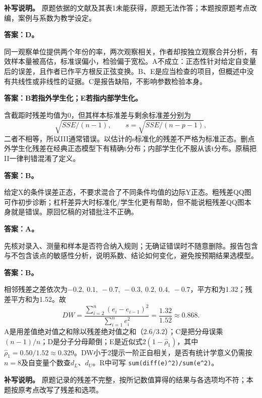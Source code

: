 \textbf{补写说明。} 原题依据的文献及其表1未能获得，原题无法作答；本题按原题考点改编，案例与系数为教学设定。



\textbf{答案：D。}

同一观察单位提供两个年份的率，两次观察相关，作者却按独立观察合并分析，有效样本量被高估，标准误偏小，检验偏于宽松。A不成立：正态性针对给定自变量后的误差，且作者已作平方根反正弦变换。B、E是应当检查的项目，但概述中没有共线性或非线性的证据。C是报告缺陷，不影响参数检验本身。



\textbf{答案：B若指外学生化；E若指内部学生化。}

含截距时残差均值为0，但其样本标准差与剩余标准差分别为\[\sqrt{SSE/(n-1)},\qquad s=\sqrt{SSE/(n-p-1)},\]二者不相等，所以III通常错误。以估计的s标准化的残差不严格为标准正态。删点外学生化残差在经典正态模型下有精确t分布；内部学生化不服从该t分布。原稿把II一律判错混淆了定义。



\textbf{答案：B。}

给定X的条件误差正态，不要求混合了不同条件均值的边际Y正态。粗残差QQ图可作初步诊断；杠杆差异大时标准化/学生化更有帮助，但不能说粗残差QQ图本身就是错误。原回忆稿的对错批注不正确。



\textbf{答案：A。}

先核对录入、测量和样本是否符合纳入规则；无确证错误时不随意删除。报告包含与不包含该点的敏感性分析，说明系数、结论如何变化，避免按预期结果选模型。



\textbf{答案：B。}

相邻残差之差依次为\(-0.2,\ 0.1,\ -0.7,\ -0.3,\ 0.2,\ 0.4,\ -0.7\)，平方和为1.32；残差平方和为1.52。故
\[DW=\frac{\sum_{i=2}^{n}(e_i-e_{i-1})^2}{\sum_{i=1}^{n}e_i^2}=\frac{1.32}{1.52}\approx0.868.\]
A是用差值绝对值之和除以残差绝对值之和（\(2.6/3.2\)）；C是把分母误乘\((n-1)/n\)；D是分子分母颠倒；E是近似式\(2(1-\hat\rho_1)\)，其中\(\hat\rho_1=0.50/1.52\approx0.329\)。DW小于2提示一阶正自相关，是否有统计学意义仍需按\(n=8\)及自变量个数查\(d_L\)、\(d_U\)。R中可写 \texttt{sum(diff(e)\^{}2)/sum(e\^{}2)}。

\textbf{补写说明。} 原题记录的残差不完整，按所记数值算得的结果与各选项均不符；本题按原考点改写了残差和选项。



